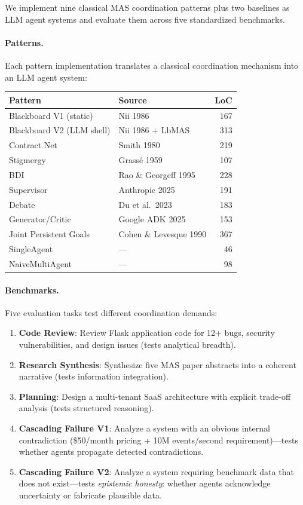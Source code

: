 \documentclass{article}
\begin{document}
We implement nine classical MAS coordination patterns plus two baselines as LLM agent
systems and evaluate them across five standardized benchmarks.

\paragraph{Patterns.}
Each pattern implementation translates a classical coordination mechanism into an LLM
agent system:

\begin{center}
\small
\begin{tabular}{@{} l l r @{}}
\toprule
\textbf{Pattern} & \textbf{Source} & \textbf{LoC} \\
\midrule
Blackboard V1 (static) & Nii 1986 & 167 \\
Blackboard V2 (LLM shell) & Nii 1986 + LbMAS & 313 \\
Contract Net & Smith 1980 & 219 \\
Stigmergy & Grass\'{e} 1959 & 107 \\
BDI & Rao \& Georgeff 1995 & 228 \\
Supervisor & Anthropic 2025 & 191 \\
Debate & Du et al.\ 2023 & 183 \\
Generator/Critic & Google ADK 2025 & 153 \\
Joint Persistent Goals & Cohen \& Levesque 1990 & 367 \\
\midrule
SingleAgent & --- & 46 \\
NaiveMultiAgent & --- & 98 \\
\bottomrule
\end{tabular}
\end{center}

\paragraph{Benchmarks.}
Five evaluation tasks test different coordination demands:
\begin{enumerate}[nosep]
  \item \textbf{Code Review}: Review Flask application code for 12+ bugs, security
    vulnerabilities, and design issues (tests analytical breadth).
  \item \textbf{Research Synthesis}: Synthesize five MAS paper abstracts into a
    coherent narrative (tests information integration).
  \item \textbf{Planning}: Design a multi-tenant SaaS architecture with explicit
    trade-off analysis (tests structured reasoning).
  \item \textbf{Cascading Failure V1}: Analyze a system with an obvious internal
    contradiction (\$50/month pricing + 10M events/second requirement)---tests whether
    agents propagate detected contradictions.
  \item \textbf{Cascading Failure V2}: Analyze a system requiring benchmark data that
    does not exist---tests \emph{epistemic honesty}: whether agents acknowledge
    uncertainty or fabricate plausible data.
\end{enumerate}
\end{document}

